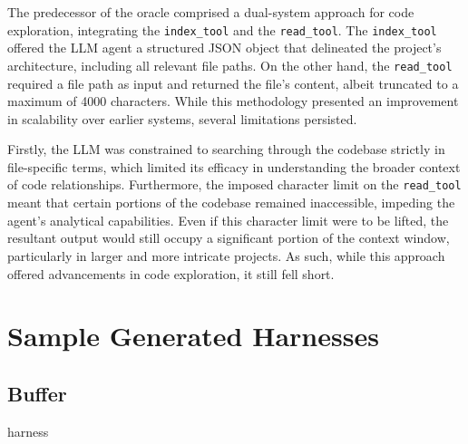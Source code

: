 \documentclass[
  a4paper,
]{scrreprt}
\theoremstyle{definition}
\theoremstyle{remark}
\begin{document}
\begin{enumerate}
  The predecessor of the oracle comprised a dual-system approach for
  code exploration, integrating the \texttt{index\_tool} and the
  \texttt{read\_tool}. The \texttt{index\_tool} offered the LLM agent a
  structured JSON object that delineated the project's architecture,
  including all relevant file paths. On the other hand, the
  \texttt{read\_tool} required a file path as input and returned the
  file's content, albeit truncated to a maximum of 4000 characters.
  While this methodology presented an improvement in scalability over
  earlier systems, several limitations persisted.

  Firstly, the LLM was constrained to searching through the codebase
  strictly in file-specific terms, which limited its efficacy in
  understanding the broader context of code relationships. Furthermore,
  the imposed character limit on the \texttt{read\_tool} meant that
  certain portions of the codebase remained inaccessible, impeding the
  agent's analytical capabilities. Even if this character limit were to
  be lifted, the resultant output would still occupy a significant
  portion of the context window, particularly in larger and more
  intricate projects. As such, while this approach offered advancements
  in code exploration, it still fell short.
\end{enumerate}

\chapter{Sample Generated Harnesses}\label{sample-generated-harnesses}

\section{Buffer}\label{buffer}

harness
\end{document}
